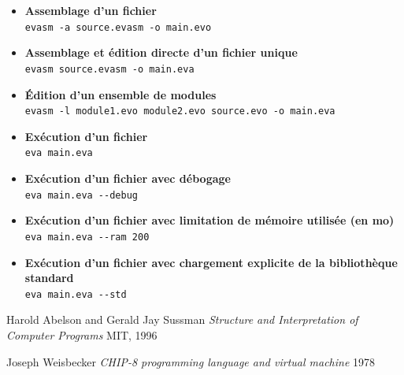 \documentclass[11pt,twoside]{article}
\begin{document}
\begin{itemize}
  \item \textbf{Assemblage d'un fichier} \\
        \lstinline$evasm -a source.evasm -o main.evo$

  \item \textbf{Assemblage et édition directe d'un fichier unique} \\
        \lstinline$evasm source.evasm -o main.eva$

  \item \textbf{Édition d'un ensemble de modules} \\
        \lstinline$evasm -l module1.evo module2.evo source.evo -o main.eva$

  \item \textbf{Exécution d'un fichier} \\
        \lstinline$eva main.eva$

  \item \textbf{Exécution d'un fichier avec débogage} \\
        \lstinline$eva main.eva --debug$

  \item \textbf{Exécution d'un fichier avec limitation de mémoire utilisée (en mo)} \\
        \lstinline$eva main.eva --ram 200$

  \item \textbf{Exécution d'un fichier avec chargement explicite de la bibliothèque standard} \\
        \lstinline$eva main.eva --std$
\end{itemize}

\cleardoublepage

\begin{thebibliography}{XXXXXX}
  \label{chap:bib}

   Harold Abelson and Gerald Jay Sussman
  \emph{Structure and Interpretation of Computer Programs} MIT, 1996

   Joseph Weisbecker
  \emph{CHIP-8 programming language and virtual machine} 1978

\end{thebibliography}
\end{document}

